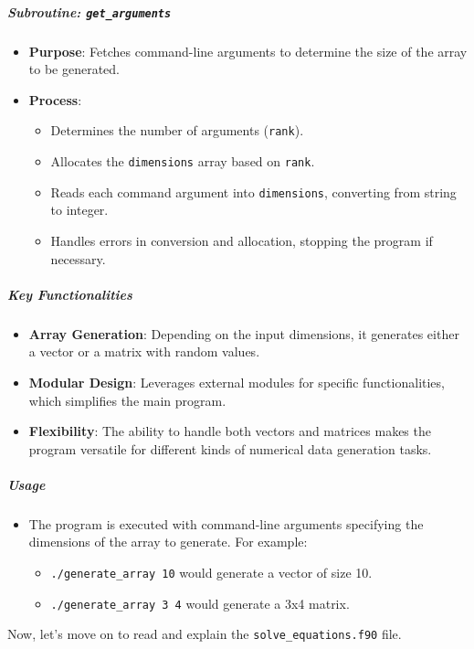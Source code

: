 \subparagraph{Subroutine: \texttt{get\_arguments}}

\begin{itemize}
\item \textbf{Purpose}: Fetches command-line arguments to determine the size of the array to be generated.
\item \textbf{Process}:

\begin{itemize}
\item Determines the number of arguments (\texttt{rank}).
\item Allocates the \texttt{dimensions} array based on \texttt{rank}.
\item Reads each command argument into \texttt{dimensions}, converting from string to integer.
\item Handles errors in conversion and allocation, stopping the program if necessary.
\end{itemize}
\end{itemize}

\subparagraph{Key Functionalities}

\begin{itemize}
\item \textbf{Array Generation}: Depending on the input dimensions, it generates either a vector or a matrix with random values.
\item \textbf{Modular Design}: Leverages external modules for specific functionalities, which simplifies the main program.
\item \textbf{Flexibility}: The ability to handle both vectors and matrices makes the program versatile for different kinds of numerical data generation tasks.
\end{itemize}

\subparagraph{Usage}

\begin{itemize}
\item The program is executed with command-line arguments specifying the dimensions of the array to generate. For example:

\begin{itemize}
\item \texttt{./generate\_array 10} would generate a vector of size 10.
\item \texttt{./generate\_array 3 4} would generate a 3x4 matrix.
\end{itemize}
\end{itemize}

Now, let's move on to read and explain the \texttt{solve\_equations.f90} file.

